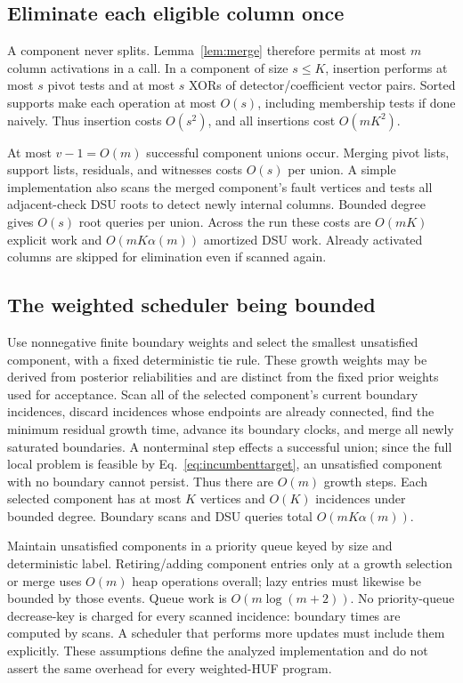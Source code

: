 \subsection{Eliminate each eligible column once}
A component never splits. Lemma~\ref{lem:merge} therefore permits at most $m$ column activations in a call. In a component of size $s\le K$, insertion performs at most $s$ pivot tests and at most $s$ XORs of detector/coefficient vector pairs. Sorted supports make each operation at most $O(s)$, including membership tests if done naively. Thus insertion costs $O(s^2)$, and all insertions cost $O(mK^2)$.

At most $v-1=O(m)$ successful component unions occur. Merging pivot lists, support lists, residuals, and witnesses costs $O(s)$ per union. A simple implementation also scans the merged component's fault vertices and tests all adjacent-check DSU roots to detect newly internal columns. Bounded degree gives $O(s)$ root queries per union. Across the run these costs are $O(mK)$ explicit work and $O(mK\alpha(m))$ amortized DSU work. Already activated columns are skipped for elimination even if scanned again.

\subsection{The weighted scheduler being bounded}
Use nonnegative finite boundary weights and select the smallest unsatisfied component, with a fixed deterministic tie rule. These growth weights may be derived from posterior reliabilities and are distinct from the fixed prior weights used for acceptance. Scan all of the selected component's current boundary incidences, discard incidences whose endpoints are already connected, find the minimum residual growth time, advance its boundary clocks, and merge all newly saturated boundaries. A nonterminal step effects a successful union; since the full local problem is feasible by Eq.~\eqref{eq:incumbenttarget}, an unsatisfied component with no boundary cannot persist. Thus there are $O(m)$ growth steps. Each selected component has at most $K$ vertices and $O(K)$ incidences under bounded degree. Boundary scans and DSU queries total $O(mK\alpha(m))$.

Maintain unsatisfied components in a priority queue keyed by size and deterministic label. Retiring/adding component entries only at a growth selection or merge uses $O(m)$ heap operations overall; lazy entries must likewise be bounded by those events. Queue work is $O(m\log(m+2))$. No priority-queue decrease-key is charged for every scanned incidence: boundary times are computed by scans. A scheduler that performs more updates must include them explicitly. These assumptions define the analyzed implementation and do not assert the same overhead for every weighted-HUF program.

